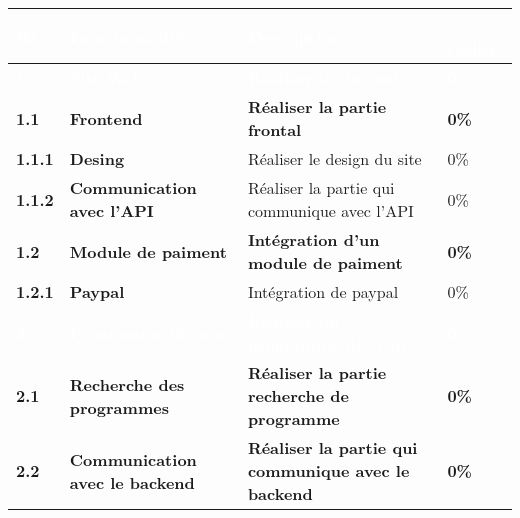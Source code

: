 \footnotesize
\begin{supertabular}{|p{1.5cm} p{6cm}|p{5cm}|R{2cm}|}
  \hline
  \textcolor{white}{\textbf{ID}} & \textcolor{white}{\textbf{Fonctionnalité}} & \textcolor{white}{\textbf{Description}} & \textcolor{white}{\textbf{\% réalisé}} \\
  \hline
  \hline


  \textcolor{white}{\textbf{1}} & \textcolor{white}{\textbf{Site Web}} & \textcolor{white}{\textbf{Réaliser le site web}} & \textcolor{white}{\textbf{0\%}} \\
  \hline

  \textbf{1.1}  & \textbf{Frontend} & \textbf{Réaliser la partie frontal} & \textbf{0\%} \\
  \hline

  \hspace{6pt}
  \textbf{1.1.1}  & \textbf{Desing} & Réaliser le design du site & 0\% \\
  \hline

  \hspace{6pt}
  \textbf{1.1.2}  & \textbf{Communication avec l'API} & Réaliser la partie qui communique avec l'API & 0\% \\
  \hline


  \textbf{1.2}  & \textbf{Module de paiment} & \textbf{Intégration d'un module de paiment} & \textbf{0\%} \\
  \hline

  \hspace{6pt} \textbf{1.2.1}  & \textbf{Paypal} & Intégration de paypal & 0\% \\
  \hline




  \textcolor{white}{\textbf{2}}  & \textcolor{white}{\textbf{Programme de scan}} & \textcolor{white}{\textbf{Réaliser un programme de scan}} & \textcolor{white}{\textbf{0\%}} \\
  \hline

  \textbf{2.1}  & \textbf{Recherche des programmes} & \textbf{Réaliser la partie recherche de programme} & \textbf{0\%} \\
  \hline

  \textbf{2.2}  & \textbf{Communication avec le backend} & \textbf{Réaliser la partie qui communique avec le backend} & \textbf{0\%} \\
  \hline


\end{supertabular}
